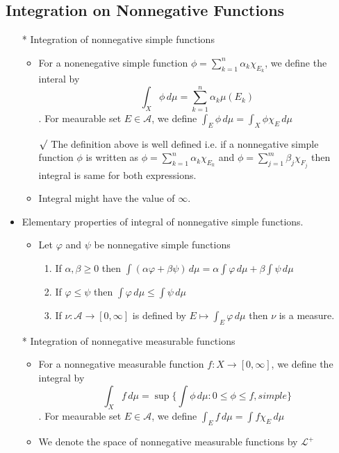 \documentclass[12pt]{article}
\newcommand{\rmk}{$\surd$}
\newcommand{\A}{\mathcal{A}}
\newcommand{\LL}{\mathcal{L}}
\newcommand{\simple}{\phi=\sum_{k=1}^n \alpha_{k} \chi_{E_k}}
\begin{document}
\subsection{Integration on Nonnegative Functions}
\begin{itemize}
    \item[*] Integration of nonnegative simple functions
    \begin{itemize}
        \item For a nonenegative simple function $\simple$, we define the interal by $$\int_X \phi \, d\mu= \sum_{k=1}^n \alpha_k \mu(E_k)$$. For meaurable set $E\in \A$, we define $\int_E \phi \, d\mu=\int_X \phi \chi_E \, d\mu$
        \item [\rmk] The definition above is well defined   i.e. if a nonnegative simple function $\phi$ is written as $\simple$ and $\phi= \sum_{j=1}^m \beta_j \chi_{F_j}$ then integral is same for both expressions.
        \item Integral might have the value of $\infty$.
    \end{itemize}
    \item Elementary properties of integral of nonnegative simple functions.
    \begin{itemize}
        \item Let $\varphi$ and $\psi$ be nonnegative simple functions
        \begin{enumerate}
            \item If $\alpha, \beta\geq 0$ then $\int (\alpha \varphi+\beta \psi)\, d\mu=\alpha \int \varphi \, d\mu+\beta \int \psi \, d\mu$
            \item If $\varphi\leq \psi$ then $\int \varphi \, d\mu \leq \int \psi \, d\mu$ 
            \item If $\nu : \A \rightarrow [0,\infty]$ is defined by $E\mapsto \int_E \varphi \, d\mu$ then $\nu$ is a measure.
        \end{enumerate}    
    \end{itemize}
    \item[*] Integration of nonnegative measurable functions
    \begin{itemize}
        \item For a nonnegative measurable function $f:X\rightarrow [0,\infty]$, we define the integral by \[\int _X f \, d\mu=\sup\{\int \phi \, d\mu : 0\leq \phi\leq f, simple\}\].  For meaurable set $E\in \A$, we define $\int_E f \, d\mu=\int f \chi_E \, d\mu$
        \item We denote the space of nonnegative measurable functions by $\LL^+$

\end{itemize}
\end{itemize}
\end{document}
